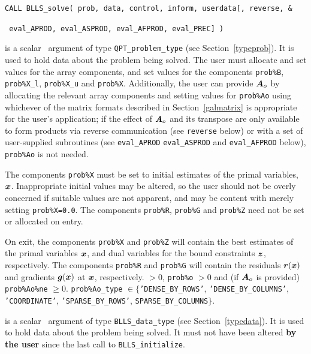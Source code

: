 \documentclass{galahad}
\newcommand{\packagename}{BLLS}
\begin{document}
\hspace{8mm}
{\tt CALL \packagename\_solve( prob, data, control, inform, userdata[,
reverse, %
\&}
\vspace*{-1mm}

\hspace{37mm}
{\tt
eval\_APROD, eval\_ASPROD, eval\_AFPROD, eval\_PREC] )}

\vspace*{-3mm}
\begin{description}
 is a scalar \intentinout\ argument of type
{\tt QPT\_problem\_type}
(see Section~\ref{typeprob}).
It is used to hold data about the problem being solved.
The user must allocate and set values for the array components,
and set values for the components
{\tt prob\%B}, {\tt prob\%X\_l}, {\tt prob\%X\_u} and {\tt prob\%X}.
Additionally, the user can provide ${\bm{A}}_o$ by allocating the
relevant array components and setting values for {\tt prob\%Ao}
using whichever
of the matrix formats described in Section~\ref{galmatrix}
is appropriate for the user's application;
if the effect of ${\bm{A}}_o$ and its transpose are only available to form products
via reverse communication (see {\tt reverse} below)
or with a set of user-supplied subroutines (see {\tt eval\_APROD}
{\tt eval\_ASPROD} and {\tt eval\_AFPROD} below), {\tt prob\%Ao} is not needed.

The components {\tt prob\%X}
must be set to initial estimates of the primal variables, ${\bm{x}}$.
Inappropriate initial values may be altered, so the user should
not be overly concerned if suitable values are not apparent, and may be
content with merely setting {\tt prob\%X=0.0}.
The components {\tt prob\%R}, {\tt prob\%G} and {\tt prob\%Z}
need not be set or allocated on entry.

On exit, the components {\tt prob\%X} and {\tt prob\%Z}
will contain the best estimates of the primal variables ${\bm{x}}$,
and dual variables for the bound constraints ${\bm{z}}$, respectively.
The components {\tt prob\%R} and {\tt prob\%G}
will contain the residuals ${\bm{r}}({\bm{x}})$
and gradients ${\bm{g}}({\bm{x}})$ at ${\bm{x}}$, respectively.
 $> 0$, {\tt prob\%o} $> 0$
              and (if ${\bm{A}}_o$ is provided) {\tt prob\%Ao\%ne} $\geq 0$.
{\tt prob\%Ao\_type} $\in \{${\tt 'DENSE\_BY\_ROWS'}, 
{\tt 'DENSE\_BY\_COLUMNS'}, {\tt 'COORDINATE'}, 
{\tt 'SPARSE\_BY\_\-ROWS'}, {\tt SPARSE\_BY\_COLUMNS}$\}$.

 is a scalar \intentinout\ argument of type
{\tt \packagename\_data\_type}
(see Section~\ref{typedata}). It is used to hold data about the problem being
solved. It must not have been altered {\bf by the user} since the last call to
{\tt \packagename\_initialize}.


\end{description}
\end{document}
